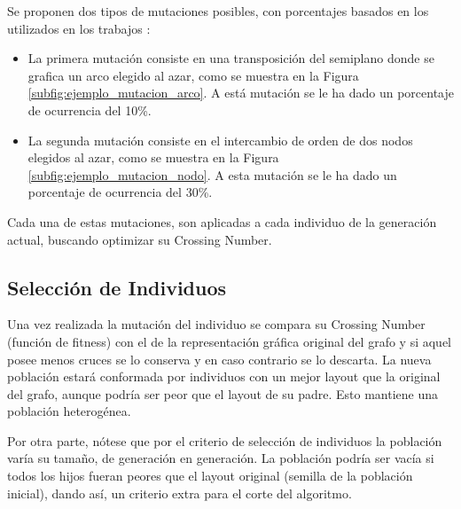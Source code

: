 	Se proponen dos tipos de mutaciones posibles, con porcentajes basados en los utilizados en los trabajos \cite{he2007parallelisation, eloranta2001timga}:
	
	\begin{itemize}
		\item La primera mutación consiste en una transposición del  semiplano donde se grafica  un arco elegido al azar, como se muestra en la Figura \ref{subfig:ejemplo_mutacion_arco}. A está mutación se le ha dado un porcentaje de ocurrencia del 10\%.
		\item La segunda mutación consiste en el intercambio de orden de dos nodos elegidos al azar, como se muestra en la Figura \ref{subfig:ejemplo_mutacion_nodo}. A esta mutación se le ha dado un porcentaje de ocurrencia del 30\%.
	\end{itemize}
	
	Cada una de estas mutaciones,  son aplicadas a  cada individuo de la generación actual, buscando optimizar su Crossing Number.
	
	\subsection{Selección de Individuos}
	\label{subsec:seleccion_individuos}
	Una vez realizada la mutación del individuo se compara su Crossing Number (función de fitness) con el de la representación gráfica original del grafo y si aquel posee menos cruces se lo conserva y en caso contrario se lo descarta.
	La  nueva población estará conformada por  individuos con un mejor layout que la  original del  grafo, aunque podría ser peor que el layout de su padre. Esto mantiene una población heterogénea.
	
	Por otra parte, nótese que por el criterio de selección de individuos la población varía su  tamaño,  de generación en generación. La población podría ser vacía si todos los hijos fueran peores que el layout original (semilla de la  población inicial),  dando así, un criterio extra para el  corte del  algoritmo.
	
	
	
